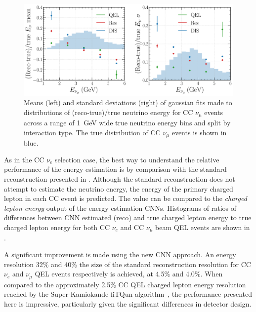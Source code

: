 \begin{figure} %
    \includegraphics[width=\textwidth]{diagrams/7-results/final_energy_numu.pdf}
    \caption[Means and standard deviations of fits to $\nu_{\mu}$ energy distributions]
    {Means (left) and standard deviations (right) of gaussian fits made to distributions of
        (reco-true)/true neutrino energy for CC $\nu_{\mu}$ events across a range of \SI{1}{GeV}
        wide true neutrino energy bins and split by interaction type. The true distribution of CC
        $\nu_{\mu}$ events is shown in blue.}
    \label{fig:final_energy_numu}
\end{figure}

As in the CC $\nu_{e}$ selection case, the best way to understand the relative performance of the
energy estimation is by comparison with the standard \chips reconstruction presented in
. Although the standard reconstruction does not attempt to estimate
the neutrino energy, the energy of the primary charged lepton in each CC event is predicted. The
value can be compared to the \emph{charged lepton energy} output of the energy estimation CNNs.
Histograms of ratios of differences between CNN estimated (reco) and true charged lepton energy to
true charged lepton energy for both CC $\nu_{e}$ and CC $\nu_{\mu}$ beam QEL events are shown in
.

A significant improvement is made using the new CNN approach. An energy resolution 32\% and 40\%
the size of the standard reconstruction resolution for CC $\nu_{e}$ and $\nu_{\mu}$ QEL events
respectively is achieved, at 4.5\% and 4.0\%. When compared to the approximately 2.5\% CC QEL
charged lepton energy resolution reached by the Super-Kamiokande fiTQun
algorithm~\cite{jiang2019}, the performance presented here is impressive, particularly given the
significant differences in detector design.


